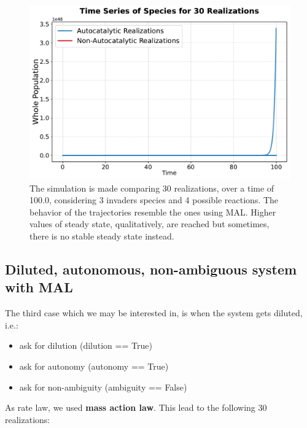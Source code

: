 \documentclass{article}
\begin{document}
\begin{figure}[H]
    \centering
    \includegraphics[width=0.6\linewidth]{traj_elegant_MM_.pdf} 
 \caption{\small{The simulation is made comparing 30 realizations, over a time of 100.0, considering 3 invaders species and 4 possible reactions. The behavior of the trajectories resemble the ones using MAL. Higher values of steady state, qualitatively, are reached but sometimes, there is no stable steady state instead.}}
   
    \label{Fig. 2b}
\end{figure}

\subsection{Diluted, autonomous, non-ambiguous system with MAL}
The third case which we may be interested in, is when the system gets diluted, i.e.:

\begin{itemize}
    \item ask for dilution (dilution == True)
    \item ask for autonomy  (autonomy == True)
    \item ask for non-ambiguity (ambiguity == False)
\end{itemize}

As rate law, we used \textbf{mass action law}. This lead to the following $30$ realizations:\\
\end{document}
